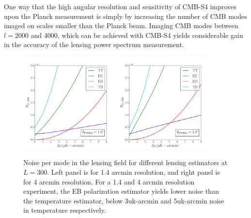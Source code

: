 One way that the high angular resolution and sensitivity
of CMB-S4 improves upon the Planck measurement is simply
by increasing the number of CMB modes imaged on scales smaller than the Planck beam.  Imaging CMB modes between $l=2000$ and 4000, which can be achieved with CMB-S4 yields considerable gain in the accuracy of the lensing power spectrum measurement.

\begin{figure}[htbp]
\centering
\includegraphics[width=0.45\textwidth]{CMBLensing/ell300_1_00.pdf}
\includegraphics[width=0.45\textwidth]{CMBLensing/ell300_3_00.pdf}
\caption{Noise per mode in the lensing field for different lensing estimators at $L = 300$.  Left panel is for 1.4 arcmin resolution, and right panel is for 4 arcmin resolution.  For a 1.4 and 4 arcmin resolution experiment, the EB polarization estimator yields lower noise than the temperature estimator, below 3uk-arcmin and 5uk-arcmin noise in temperature respectively.}
\label{crossoverPlot}
\end{figure}


